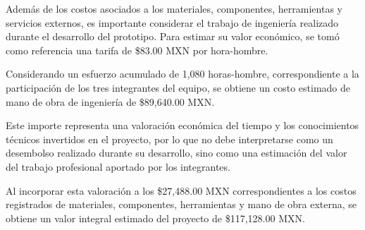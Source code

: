 Además de los costos asociados a los materiales, componentes, herramientas y servicios externos, es importante considerar el trabajo de ingeniería realizado durante el desarrollo del prototipo. Para estimar su valor económico, se tomó como referencia una tarifa de \$83.00 MXN por hora-hombre.

Considerando un esfuerzo acumulado de 1,080 horas-hombre, correspondiente a la participación de los tres integrantes del equipo, se obtiene un costo estimado de mano de obra de ingeniería de \$89,640.00 MXN.

Este importe representa una valoración económica del tiempo y los conocimientos técnicos invertidos en el proyecto, por lo que no debe interpretarse como un desembolso realizado durante su desarrollo, sino como una estimación del valor del trabajo profesional aportado por los integrantes.

Al incorporar esta valoración a los \$27,488.00 MXN correspondientes a los costos registrados de materiales, componentes, herramientas y mano de obra externa, se obtiene un valor integral estimado del proyecto de \$117,128.00 MXN.

